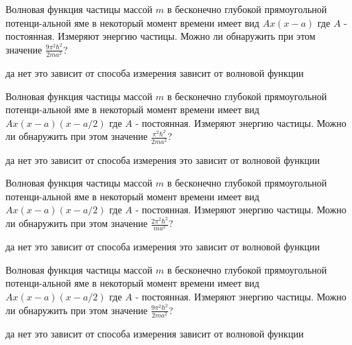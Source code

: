 \documentclass[11pt,a4paper]{exam}
\begin{document}
\begin{questions}
\question Волновая функция частицы массой $m$ в бесконечно глубокой прямоугольной потенци-альной яме в некоторый момент времени имеет вид $Ax(x - a)$ где $A$ - постоянная. Измеряют энергию частицы. Можно ли обнаружить при этом значение $\frac{{9{\pi ^2}{\hbar ^2}}}{{2m{a^2}}}$?
\begin{choices}
\choice да                
\choice нет
\choice это зависит от способа измерения 
\choice зависит от волновой функции
\end{choices}

\question Волновая функция частицы массой $m$ в бесконечно глубокой прямоугольной потенци-альной яме в некоторый момент времени имеет вид $Ax(x - a)(x - a/2)$ где $A$ - постоянная. Измеряют энергию частицы. Можно ли обнаружить при этом значение $\frac{{{\pi ^2}{\hbar ^2}}}{{2m{a^2}}}$?
\begin{choices}
\choice да                
\choice нет
\choice это зависит от способа измерения 
\choice это зависит от волновой функции
\end{choices}

\question Волновая функция частицы массой $m$ в бесконечно глубокой прямоугольной потенци-альной яме в некоторый момент времени имеет вид $Ax(x - a)(x - a/2)$ где $A$ - постоянная. Измеряют энергию частицы. Можно ли обнаружить при этом значение $\frac{{2{\pi ^2}{\hbar ^2}}}{{m{a^2}}}$?
\begin{choices}
\choice да                
\choice нет
\choice это зависит от способа измерения 
\choice это зависит от волновой функции
\end{choices}

\question Волновая функция частицы массой $m$ в бесконечно глубокой прямоугольной потенци-альной яме в некоторый момент времени имеет вид $Ax(x - a)(x - a/2)$ где $A$ - постоянная. Измеряют энергию частицы. Можно ли обнаружить при этом значение $\frac{{9{\pi ^2}{\hbar ^2}}}{{2m{a^2}}}$?
\begin{choices}
\choice да                
\choice нет
\choice это зависит от способа измерения 
\choice зависит от волновой функции
\end{choices}


\end{questions}
\end{document}
